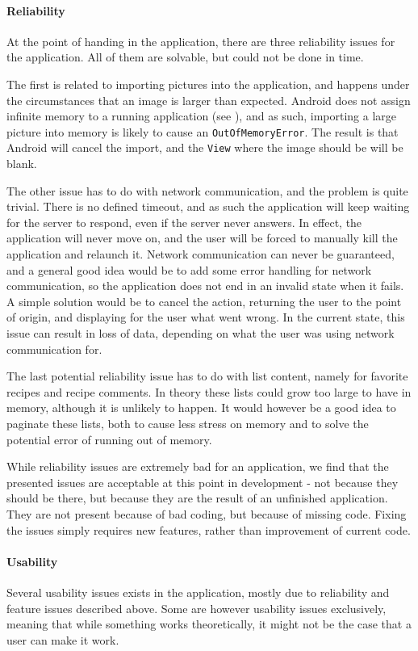 \paragraph{Reliability}
At the point of handing in the application, there are three reliability issues for the application. All of them are solvable, but could not be done in time.

The first is related to importing pictures into the application, and happens under the circumstances that an image is larger than expected. Android does not assign infinite memory to a running application (see \citep{android_memory}), and as such, importing a large picture into memory is likely to cause an \texttt{OutOfMemoryError}. The result is that Android will cancel the import, and the \texttt{View} where the image should be will be blank.

The other issue has to do with network communication, and the problem is quite trivial. There is no defined timeout, and as such the application will keep waiting for the server to respond, even if the server never answers. In effect, the application will never move on, and the user will be forced to manually kill the application and relaunch it. Network communication can never be guaranteed, and a general good idea would be to add some error handling for network communication, so the application does not end in an invalid state when it fails. A simple solution would be to cancel the action, returning the user to the point of origin, and displaying for the user what went wrong.
In the current state, this issue can result in loss of data, depending on what the user was using network communication for.

The last potential reliability issue has to do with list content, namely for favorite recipes and recipe comments. In theory these lists could grow too large to have in memory, although it is unlikely to happen. It would however be a good idea to paginate these lists, both to cause less stress on memory and to solve the potential error of running out of memory.

While reliability issues are extremely bad for an application, we find that the presented issues are acceptable at this point in development - not because they should be there, but because they are the result of an unfinished application. They are not present because of bad coding, but because of missing code. Fixing the issues simply requires new features, rather than improvement of current code.

\paragraph{Usability}
Several usability issues exists in the application, mostly due to reliability and feature issues described above. Some are however usability issues exclusively, meaning that while something works theoretically, it might not be the case that a user can make it work.

